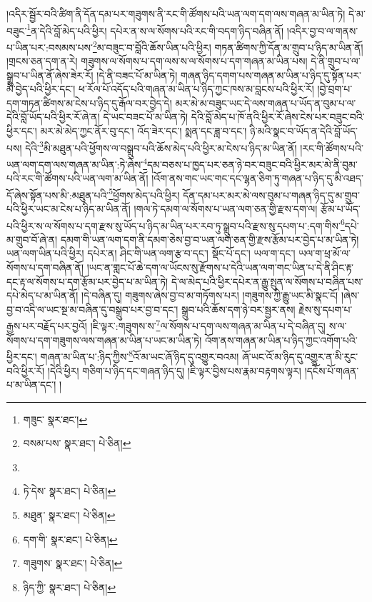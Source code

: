 །འདིར་སྦྱོར་བའི་ཚིག་ནི་དོན་དམ་པར་གཟུགས་ནི་རང་གི་ཚོགས་པའི་ཡན་ལག་དག་ལས་གཞན་མ་ཡིན་ཏེ། དེ་མ་བཟུང་\footnote{གཟུང་  སྣར་ཐང་། }ན་དེའི་བློ་མེད་པའི་ཕྱིར། དཔེར་ན་ས་ལ་སོགས་པའི་རང་གི་བདག་ཉིད་བཞིན་ནོ། །འདིར་བྱ་བ་ལ་གནས་པ་ཡིན་པར་:བསམས་པས་\footnote{བསམ་པས་  སྣར་ཐང་།  པེ་ཅིན། }མ་བཟུང་བ་བློའི་ཆོས་ཡིན་པའི་ཕྱིར། གཏན་ཚིགས་ཀྱི་དོན་མ་གྲུབ་པ་ཉིད་མ་ཡིན་ནོ། །གྲངས་ཅན་དག་ན་རེ། གཟུགས་ལ་སོགས་པ་དག་ལས་ས་ལ་སོགས་པ་དག་གཞན་མ་ཡིན་པས། དེ་ནི་གྲུབ་པ་ལ་སྒྲུབ་པ་ཡིན་ནོ་ཞེས་ཟེར་རོ། །དེ་ནི་བཟང་པོ་མ་ཡིན་ཏེ། གཞན་ཉིད་དགག་པས་གཞན་མ་ཡིན་པ་ཉིད་དུ་སྟོན་པར་མི་བྱེད་པའི་ཕྱིར་དང་། ཕ་རོལ་པོ་འདོད་པའི་གཞན་མ་ཡིན་པ་ཉིད་ཀྱང་ཁས་མ་བླངས་པའི་ཕྱིར་རོ། །བྱེ་བྲག་པ་དག་གཏན་ཚིགས་མ་ངེས་པ་ཉིད་དུ་རྒོལ་བར་བྱེད་དེ། མར་མེ་མ་བཟུང་ཡང་དེ་ལས་གཞན་པ་ཡོད་ན་བུམ་པ་ལ་དེའི་བློ་ཡོད་པའི་ཕྱིར་རོ་ཞེ་ན། དེ་ཡང་བཟང་པོ་མ་ཡིན་ཏེ། དེའི་བློ་མེད་པ་ཁོ་ནའི་ཕྱིར་རོ་ཞེས་ངེས་པར་བཟུང་བའི་ཕྱིར་དང་། མར་མེ་མེད་ཀྱང་ནོར་བུ་དང་། འོད་ཟེར་དང་། སྨན་དང་ཟླ་བ་དང་། ཉི་མའི་སྣང་བ་ཡོད་ན་དེའི་བློ་ཡོད་པས། དེའི་\footnote{}མི་མཐུན་པའི་ཕྱོགས་ལ་བསྒྲུབ་པའི་ཆོས་མེད་པའི་ཕྱིར་མ་ངེས་པ་ཉིད་མ་ཡིན་ནོ། །རང་གི་ཚོགས་པའི་ཡན་ལག་དག་ལས་གཞན་མ་ཡིན་:ཏེ་ཞེས་\footnote{ཏེ་དེས་  སྣར་ཐང་།  པེ་ཅིན། }དམ་བཅས་པ་ཁྱད་པར་ཅན་ཉེ་བར་བཟུང་བའི་ཕྱིར་མར་མེ་ནི་བུམ་པའི་རང་གི་ཚོགས་པའི་ཡན་ལག་མ་ཡིན་ནོ། །འོག་ནས་གང་ཡང་གང་དང་ལྷན་ཅིག་ཏུ་གཞན་པ་ཉིད་དུ་མི་འཐད་དོ་ཞེས་སྟོན་པས་མི་:མཐུན་པའི་\footnote{མཐུན་  སྣར་ཐང་།  པེ་ཅིན། }ཕྱོགས་མེད་པའི་ཕྱིར། དོན་དམ་པར་མར་མེ་ལས་བུམ་པ་གཞན་ཉིད་དུ་མ་གྲུབ་པའི་ཕྱིར་ཡང་མ་ངེས་པ་ཉིད་མ་ཡིན་ནོ། །གལ་ཏེ་དམག་ལ་སོགས་པ་ཡན་ལག་ཅན་གྱི་རྫས་དག་ལ། རྩོམ་པ་ཡོད་པའི་ཕྱིར་ས་ལ་སོགས་པ་དག་རྫས་སུ་ཡོད་པ་ཉིད་མ་ཡིན་པར་རབ་ཏུ་སྒྲུབ་པའི་རྫས་སུ་དཔག་པ་:དག་གིས་\footnote{དག་གི་  སྣར་ཐང་།  པེ་ཅིན། }དཔེ་མ་གྲུབ་བོ་ཞེ་ན། དམག་གི་ཡན་ལག་དག་ནི་དམག་ཅེས་བྱ་བ་ཡན་ལག་ཅན་གྱི་རྫས་རྩོམ་པར་བྱེད་པ་མ་ཡིན་ཏེ། ཡན་ལག་ཡིན་པའི་ཕྱིར། དཔེར་ན། ཤིང་གི་ཡན་ལག་རྩ་བ་དང་། སྡོང་པོ་དང་། ཡལ་ག་དང་། ཡལ་ག་ཕྲ་མོ་ལ་སོགས་པ་དག་བཞིན་ནོ། །ཡང་ན་གླང་པོ་ཆེ་དག་ལ་ཡོངས་སུ་རྫོགས་པ་དེའི་ཡན་ལག་གང་ཡིན་པ་དེ་ནི་ཤིང་རྟ་དང་རྟ་ལ་སོགས་པ་དག་རྩོམ་པར་བྱེད་པ་མ་ཡིན་ཏེ། དེ་ལ་མེད་པའི་ཕྱིར་དཔེར་ན་རྒྱུ་སྤུན་ལ་སོགས་པ་བཞིན་པས་དཔེ་མེད་པ་མ་ཡིན་ནོ། །དེ་བཞིན་དུ། གཟུགས་ཞེས་བྱ་བ་མ་གཏོགས་པར། །གཟུགས་ཀྱི་རྒྱུ་ཡང་མི་སྣང་ངོ། །ཞེས་བྱ་བ་འདི་ལ་ཡང་སྔ་མ་བཞིན་དུ་བསྒྲུབ་པར་བྱ་བ་དང་། སྒྲུབ་པའི་ཆོས་དག་ཉེ་བར་སྦྱར་ནས། རྗེས་སུ་དཔག་པ་རྒྱས་པར་བརྗོད་པར་བྱའོ། །ཇི་ལྟར་:གཟུགས་ས་\footnote{གཟུགས་  སྣར་ཐང་།  པེ་ཅིན། }ལ་སོགས་པ་དག་ལས་གཞན་མ་ཡིན་པ་དེ་བཞིན་དུ། ས་ལ་སོགས་པ་དག་གཟུགས་ལས་གཞན་མ་ཡིན་པ་ཡང་མ་ཡིན་ཏེ། འོག་ནས་གཞན་མ་ཡིན་པ་ཉིད་ཀྱང་འགོག་པའི་ཕྱིར་དང་། གཞན་མ་ཡིན་པ་:ཉིད་ཀྱིས་\footnote{ཉིད་ཀྱི་  སྣར་ཐང་།  པེ་ཅིན། }འོ་མ་ཡང་ཞོ་ཉིད་དུ་འགྱུར་བའམ། ཞོ་ཡང་འོ་མ་ཉིད་དུ་འགྱུར་ན་མི་རུང་བའི་ཕྱིར་རོ། །དེའི་ཕྱིར། གཅིག་པ་ཉིད་དང་གཞན་ཉིད་དུ། །ཇི་ལྟར་བྱིས་པས་རྣམ་བརྟགས་ལྟར། །དངོས་པོ་གཞན་པ་མ་ཡིན་དང་། །
